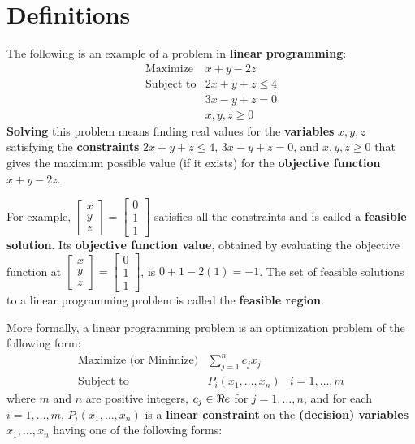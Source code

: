 %


\section{Definitions}\label{definitions}

The following is an example of a problem in \textbf{linear programming}:
\[
\begin{array}{rl}
\text{Maximize} & x + y - 2z \\
\text{Subject to} &  2x + y + z \leq 4 \\
& 3x - y + z = 0 \\
&  x, y, z \geq 0
\end{array}
\] \textbf{Solving} this problem means finding real values for the
\textbf{variables} \(x,y,z\) satisfying the \textbf{constraints}
\(2x + y + z \leq 4\), \(3x-y +z =0\), and \(x,y,z \geq 0\) that gives
the maximum possible value (if it exists) for the \textbf{objective
function} \(x + y - 2z\).

For example,
\(\begin{bmatrix} x\\y\\z\end{bmatrix} = \begin{bmatrix} 0 \\ 1 \\ 1\end{bmatrix}\)
satisfies all the constraints and is called a \textbf{feasible
solution}. Its \textbf{objective function value}, obtained by evaluating
the objective function at
\(\begin{bmatrix} x\\y\\z\end{bmatrix} = \begin{bmatrix} 0 \\ 1 \\ 1\end{bmatrix}\),
is \(0 + 1 - 2(1) = -1\). The set of feasible solutions to a linear
programming problem is called the \textbf{feasible region}.

More formally, a linear programming problem is an optimization problem
of the following form: \[
\begin{array}{rll}
\text{Maximize (or Minimize)} & \displaystyle\sum_{j=1}^n c_j x_j \\
\text{Subject to} &  P_i(x_1, \ldots, x_n) & i = 1,\ldots, m
\end{array}
\] where \(m\) and \(n\) are positive integers, \(c_j \in \Re e\) for
\(j = 1,\ldots, n\), and for each \(i = 1,\ldots, m\),
\(P_i(x_1,\ldots, x_n)\) is a \textbf{linear constraint} on the
\textbf{(decision) variables} \(x_1,\ldots, x_n\) having one of the
following forms:

